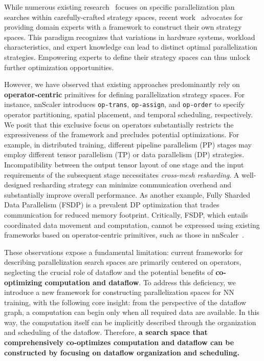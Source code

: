 
While numerous existing research~\cite{tarnawski2021piper, zheng2022alpa, liu2024aceso} focuses on specific parallelization plan searches within carefully-crafted strategy spaces, recent work~\cite{lin2024nnscaler} advocates for providing domain experts with a framework to construct their own strategy spaces. This paradigm recognizes that variations in hardware systems, workload characteristics, and expert knowledge can lead to distinct optimal parallelization strategies. Empowering experts to define their strategy spaces can thus unlock further optimization opportunities.

However, we have observed that existing approaches predominantly rely on \textbf{operator-centric} primitives for defining parallelization strategy spaces. For instance, nnScaler introduces \texttt{op-trans}, \texttt{op-assign}, and \texttt{op-order} to specify operator partitioning, spatial placement, and temporal scheduling, respectively. We posit that this exclusive focus on operators substantially restricts the expressiveness of the framework and precludes potential optimizations. For example, in distributed training, different pipeline parallelism (PP) stages may employ different tensor parallelism (TP) or data parallelism (DP) strategies. Incompatibility between the output tensor layout of one stage and the input requirements of the subsequent stage necessitates \textit{cross-mesh resharding}. A well-designed resharding strategy can minimize communication overhead and substantially improve overall performance. As another example, Fully Sharded Data Parallelism (FSDP) is a prevalent DP optimization that trades communication for reduced memory footprint.  Critically, FSDP, which entails coordinated data movement and computation, cannot be expressed using existing frameworks based on operator-centric primitives, such as those in nnScaler~\cite{lin2024nnscaler}.

These observations expose a fundamental limitation: current frameworks for describing parallelization search spaces are primarily centered on operators, neglecting the crucial role of dataflow and the potential benefits of \textbf{co-optimizing computation and dataflow}. To address this deficiency, we introduce a new framework for constructing parallelization spaces for NN training, with the following core insight: from the perspective of the dataflow graph, a computation can begin only when all required data are available. In this way, the computation itself can be implicitly described through the organization and scheduling of the dataflow. Therefore, \textbf{a search space that comprehensively co-optimizes computation and dataflow can be constructed by focusing on dataflow organization and scheduling.}

